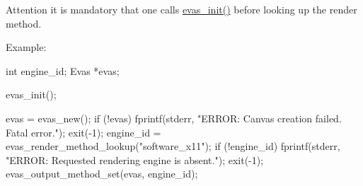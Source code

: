 \begin{DoxyAttention}{Attention}
it is mandatory that one calls \hyperlink{group__Evas__Group_ga939a904ec53bf80796a8ad763cbb4c3c}{evas\_\-init()} before looking up the render method.
\end{DoxyAttention}
Example: 
\begin{DoxyCode}
 int engine_id;
 Evas *evas;

 evas_init();

 evas = evas_new();
 if (!evas)
   {
     fprintf(stderr, "ERROR: Canvas creation failed. Fatal error.\n");
     exit(-1);
   }
 engine_id = evas_render_method_lookup("software_x11");
 if (!engine_id)
   {
     fprintf(stderr, "ERROR: Requested rendering engine is absent.\n");
     exit(-1);
   }
 evas_output_method_set(evas, engine_id);
\end{DoxyCode}
 